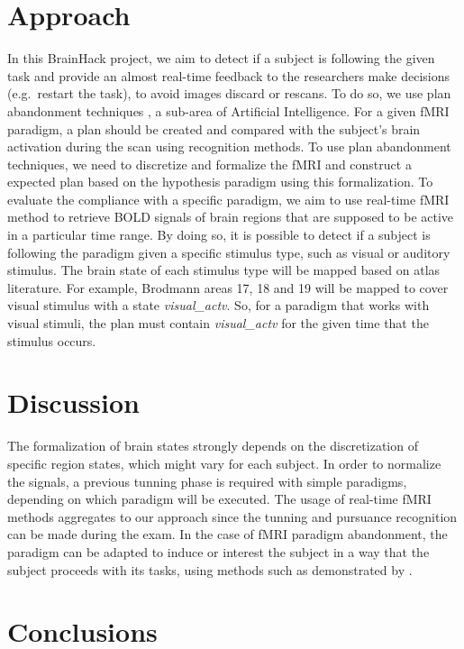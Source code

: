 \documentclass[twocolumn]{bmcart}%
\begin{document}
\section{Approach}\label{approach}

In this BrainHack project, we aim to detect if a subject is following
the given task and provide an almost real-time feedback to the
researchers make decisions (e.g.~restart the task), to avoid images
discard or rescans. To do so, we use plan abandonment techniques
\cite{Sukthankar2014}, a sub-area of Artificial Intelligence. For a
given fMRI paradigm, a plan should be created and compared with the
subject's brain activation during the scan using recognition methods. To
use plan abandonment techniques, we need to discretize and formalize the
fMRI and construct a expected plan based on the hypothesis paradigm
using this formalization. To evaluate the compliance with a specific
paradigm, we aim to use real-time fMRI method to retrieve BOLD signals
of brain regions that are supposed to be active in a particular time
range. By doing so, it is possible to detect if a subject is following
the paradigm given a specific stimulus type, such as visual or auditory
stimulus. The brain state of each stimulus type will be mapped based on
atlas literature. For example, Brodmann areas 17, 18 and 19 will be
mapped to cover visual stimulus with a state \emph{visual\_actv}. So,
for a paradigm that works with visual stimuli, the plan must contain
\emph{visual\_actv} for the given time that the stimulus occurs.

\section{Discussion}\label{discussion}

The formalization of brain states strongly depends on the discretization
of specific region states, which might vary for each subject. In order
to normalize the signals, a previous tunning phase is required with
simple paradigms, depending on which paradigm will be executed. The
usage of real-time fMRI methods aggregates to our approach since the
tunning and pursuance recognition can be made during the exam. In the
case of fMRI paradigm abandonment, the paradigm can be adapted to induce
or interest the subject in a way that the subject proceeds with its
tasks, using methods such as demonstrated by \cite{Dongha2011}.

\section{Conclusions}\label{conclusions}
\end{document}
